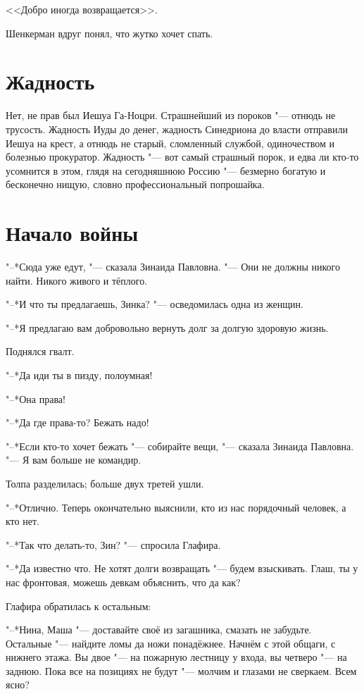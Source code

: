 <<Добро иногда возвращается>>.

Шенкерман вдруг понял, что жутко хочет спать.

\section{Жадность}

Нет, не прав был Иешуа Га-Ноцри.
Страшнейший из пороков "--- отнюдь не трусость. 
Жадность Иуды до денег, жадность Синедриона до власти отправили Иешуа на крест, а отнюдь не старый, сломленный службой, одиночеством и болезнью прокуратор.
Жадность "--- вот самый страшный порок, и едва ли кто-то усомнится в этом, глядя на сегодняшнюю Россию "--- безмерно богатую и бесконечно нищую, словно профессиональный попрошайка.

\section{Начало войны}

"--*Сюда уже едут, "--- сказала Зинаида Павловна.
"--- Они не должны никого найти.
Никого живого и тёплого.

"--*И что ты предлагаешь, Зинка? "--- осведомилась одна из женщин.

"--*Я предлагаю вам добровольно вернуть долг за долгую здоровую жизнь.

Поднялся гвалт.

"--*Да иди ты в пизду, полоумная!

"--*Она права!

"--*Да где права-то?
Бежать надо!

"--*Если кто-то хочет бежать "--- собирайте вещи, "--- сказала Зинаида Павловна.
"--- Я вам больше не командир.

Толпа разделилась;
больше двух третей ушли.

"--*Отлично.
Теперь окончательно выяснили, кто из нас порядочный человек, а кто нет.

"--*Так что делать-то, Зин? "--- спросила Глафира.

"--*Да известно что.
Не хотят долги возвращать "--- будем взыскивать.
Глаш, ты у нас фронтовая, можешь девкам объяснить, что да как?

Глафира обратилась к остальным:

"--*Нина, Маша "--- доставайте своё из загашника, смазать не забудьте.
Остальные "--- найдите ломы да ножи понадёжнее.
Начнём с этой общаги, с нижнего этажа.
Вы двое "--- на пожарную лестницу у входа, вы четверо "--- на заднюю.
Пока все на позициях не будут "--- молчим и глазами не сверкаем.
Всем ясно? 

